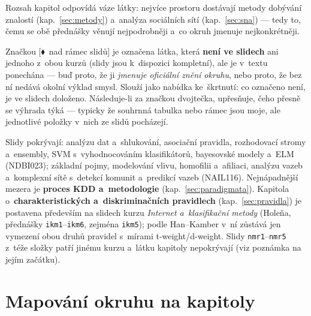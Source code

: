 \documentclass[11pt,a4paper]{article}
\theoremstyle{definition}
\newcommand{\mimo}{\textcolor{markcol}{\textsf{\footnotesize[$\blacklozenge$~nad rámec slidů]}}}
\begin{document}
\begin{center}
\begin{minipage}{0.92\textwidth}
\begin{poznbox}
\small
Rozsah kapitol odpovídá váze látky: nejvíce prostoru dostávají metody dobývání znalostí
(kap.~\ref{sec:metody}) a~analýza sociálních sítí (kap.~\ref{sec:sna}) --- tedy to, čemu
se obě přednášky věnují nejpodrobněji a~co okruh jmenuje nejkonkrétněji.

Značkou \mimo{} je označena látka, která \textbf{není ve slidech} ani jednoho z~obou kurzů
(slidy jsou k~dispozici kompletní), ale je v~textu ponechána --- buď proto, že ji
\emph{jmenuje oficiální znění okruhu}, nebo proto, že bez ní nedává okolní výklad smysl.
Slouží jako nabídka ke~škrtnutí: co označeno není, je ve slidech doloženo. Následuje-li za
značkou dvojtečka, upřesňuje, čeho přesně se výhrada týká --- typicky že souhrnná tabulka
nebo rámec jsou moje, ale jednotlivé položky v~nich ze slidů pocházejí.

Slidy pokrývají: analýzu dat a~shlukování, asociační pravidla, rozhodovací stromy
a~ensembly, SVM s~vyhodnocováním klasifikátorů, bayesovské modely a~ELM (NDBI023);
základní pojmy, modelování vlivu, homofilii a~afiliaci, analýzu vazeb a~komplexní sítě
s~detekcí komunit a~predikcí vazeb (NAIL116). Nejnápadnější mezera je
\textbf{proces KDD a~metodologie} (kap.~\ref{sec:paradigmata}). Kapitola
o~\textbf{charakteristických a~diskriminačních pravidlech} (kap.~\ref{sec:pravidla}) je
postavena především na slidech kurzu \emph{Internet a~klasifikační metody} (Holeňa,
přednášky \texttt{ikm1}--\texttt{ikm6}, zejména \texttt{ikm5}); podle Han--Kamber v~ní
zůstává jen vymezení obou druhů pravidel s~mírami t-weight/d-weight. Slidy
\texttt{nmr1}--\texttt{nmr5} z~téže složky patří jinému kurzu a~látku kapitoly
nepokrývají (viz poznámka na jejím začátku).
\end{poznbox}
\end{minipage}
\end{center}

\vspace{2mm}

\section*{Mapování okruhu na kapitoly}
\end{document}
